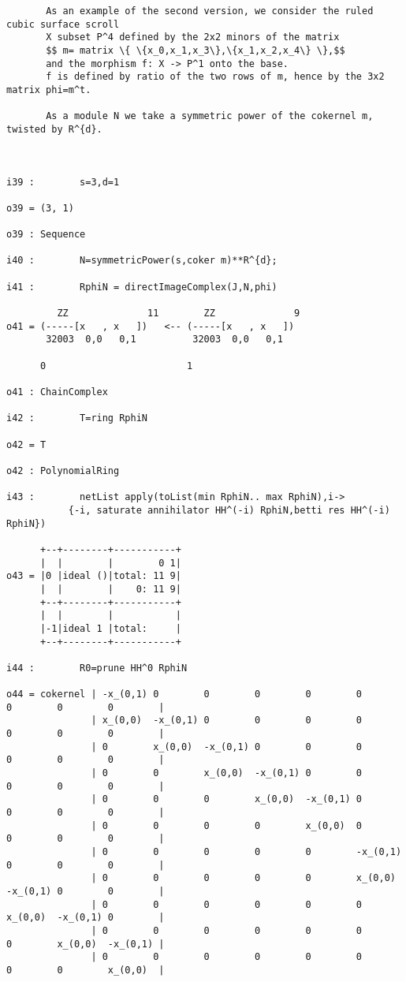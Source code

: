 \documentclass[twoside,12pt, leqno]{amsart}
\begin{document}
\begin{verbatim}
       As an example of the second version, we consider the ruled cubic surface scroll
       X subset P^4 defined by the 2x2 minors of the matrix
       $$ m= matrix \{ \{x_0,x_1,x_3\},\{x_1,x_2,x_4\} \},$$
       and the morphism f: X -> P^1 onto the base.
       f is defined by ratio of the two rows of m, hence by the 3x2 matrix phi=m^t.
       
       As a module N we take a symmetric power of the cokernel m, twisted by R^{d}.



i39 :        s=3,d=1

o39 = (3, 1)

o39 : Sequence

i40 :        N=symmetricPower(s,coker m)**R^{d};

i41 :        RphiN = directImageComplex(J,N,phi)

         ZZ              11        ZZ              9
o41 = (-----[x   , x   ])   <-- (-----[x   , x   ])
       32003  0,0   0,1          32003  0,0   0,1
                                 
      0                         1

o41 : ChainComplex

i42 :        T=ring RphiN

o42 = T

o42 : PolynomialRing

i43 :        netList apply(toList(min RphiN.. max RphiN),i-> 
      	   {-i, saturate annihilator HH^(-i) RphiN,betti res HH^(-i) RphiN})

      +--+--------+-----------+
      |  |        |        0 1|
o43 = |0 |ideal ()|total: 11 9|
      |  |        |    0: 11 9|
      +--+--------+-----------+
      |  |        |           |
      |-1|ideal 1 |total:     |
      +--+--------+-----------+

i44 :        R0=prune HH^0 RphiN

o44 = cokernel | -x_(0,1) 0        0        0        0        0        0        0        0        |
               | x_(0,0)  -x_(0,1) 0        0        0        0        0        0        0        |
               | 0        x_(0,0)  -x_(0,1) 0        0        0        0        0        0        |
               | 0        0        x_(0,0)  -x_(0,1) 0        0        0        0        0        |
               | 0        0        0        x_(0,0)  -x_(0,1) 0        0        0        0        |
               | 0        0        0        0        x_(0,0)  0        0        0        0        |
               | 0        0        0        0        0        -x_(0,1) 0        0        0        |
               | 0        0        0        0        0        x_(0,0)  -x_(0,1) 0        0        |
               | 0        0        0        0        0        0        x_(0,0)  -x_(0,1) 0        |
               | 0        0        0        0        0        0        0        x_(0,0)  -x_(0,1) |
               | 0        0        0        0        0        0        0        0        x_(0,0)  |


\end{verbatim}
\end{document}
